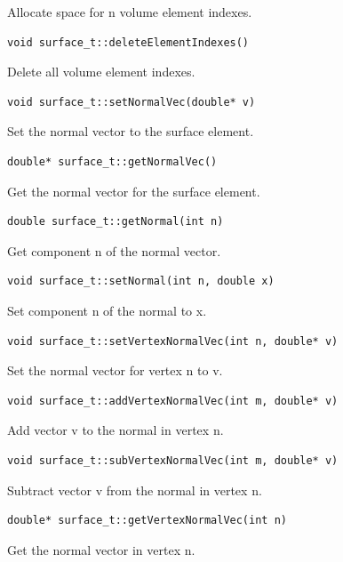 Allocate space for n volume element indexes.
\begin{verbatim}
void surface_t::deleteElementIndexes()
\end{verbatim}
Delete all volume element indexes.
\begin{verbatim}
void surface_t::setNormalVec(double* v)
\end{verbatim}
Set the normal vector to the surface element.
\begin{verbatim}
double* surface_t::getNormalVec()
\end{verbatim}
Get the normal vector for the surface element.
\begin{verbatim}
double surface_t::getNormal(int n)
\end{verbatim}
Get component n of the normal vector.
\begin{verbatim}
void surface_t::setNormal(int n, double x)
\end{verbatim}
Set component n of the normal to x.
\begin{verbatim}
void surface_t::setVertexNormalVec(int n, double* v)
\end{verbatim}
Set the normal vector for vertex n to v.
\begin{verbatim}
void surface_t::addVertexNormalVec(int m, double* v)
\end{verbatim}
Add vector v to the normal in vertex n.
\begin{verbatim}
void surface_t::subVertexNormalVec(int m, double* v)
\end{verbatim}
Subtract vector v from the normal in vertex n.
\begin{verbatim}
double* surface_t::getVertexNormalVec(int n)
\end{verbatim}
Get the normal vector in vertex n.

